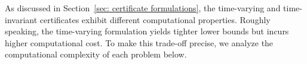 \documentclass[journal,twoside,web]{ieeecolor}
\newcommand{\ml}[1]{{\color{blue}[ML: #1]}}
\newcommand{\safe}{\mathrm{s}}
\newcommand{\reach}{\mathrm{r}}
\newcommand{\px}{\mathbf{x}}
\newcommand{\hor}{H}
\newcommand{\RA}{\mathcal{R}}
\theoremstyle{definition}
\theoremstyle{plain}
\newtheorem{corollary}[theorem]{Corollary}
\theoremstyle{plain}
\newtheorem{remark}{Remark}
\begin{document}

As discussed in Section~\ref{sec: certificate formulations}, the time-varying and time-invariant certificates exhibit different computational properties. Roughly speaking, the time-varying formulation yields tighter lower bounds but incurs higher computational cost. To make this trade-off precise, we analyze the computational complexity of each problem below.










\end{document}
